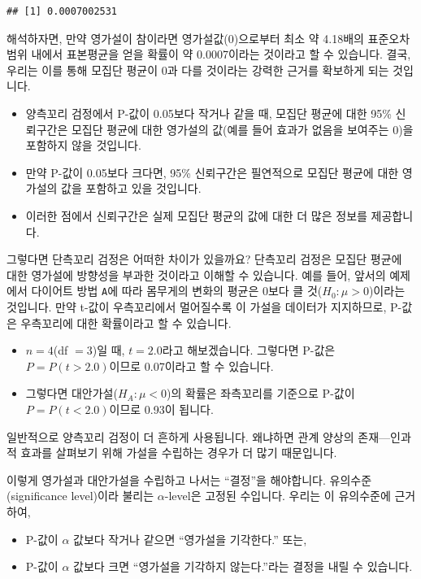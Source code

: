 \documentclass[]{book}
\begin{document}
\begin{verbatim}
## [1] 0.0007002531
\end{verbatim}

해석하자면, 만약 영가설이 참이라면 영가설값(0)으로부터 최소 약 4.18배의 표준오차 범위 내에서 표본평균을 얻을 확률이 약 0.0007이라는 것이라고 할 수 있습니다. 결국, 우리는 이를 통해 모집단 평균이 0과 다를 것이라는 강력한 근거를 확보하게 되는 것입니다.

\begin{itemize}
\item
  양측꼬리 검정에서 P-값이 0.05보다 작거나 같을 때, 모집단 평균에 대한 95\% 신뢰구간은 모집단 평균에 대한 영가설의 값(예를 들어 효과가 없음을 보여주는 0)을 포함하지 않을 것입니다.
\item
  만약 P-값이 0.05보다 크다면, 95\% 신뢰구간은 필연적으로 모집단 평균에 대한 영가설의 값을 포함하고 있을 것입니다.
\item
  이러한 점에서 신뢰구간은 실제 모집단 평균의 값에 대한 더 많은 정보를 제공합니다.
\end{itemize}

그렇다면 단측꼬리 검정은 어떠한 차이가 있을까요? 단측꼬리 검정은 모집단 평균에 대한 영가설에 방향성을 부과한 것이라고 이해할 수 있습니다. 예를 들어, 앞서의 예제에서 다이어트 방법 \texttt{A}에 따라 몸무게의 변화의 평균은 0보다 클 것(\(H_0: \mu > 0\))이라는 것입니다. 만약 t-값이 우측꼬리에서 멀어질수록 이 가설을 데이터가 지지하므로, P-값은 우측꼬리에 대한 확률이라고 할 수 있습니다.

\begin{itemize}
\item
  \(n = 4\)(df \(=3\))일 때, \(t = 2.0\)라고 해보겠습니다. 그렇다면 P-값은 \(P = P(t > 2.0)\)이므로 0.07이라고 할 수 있습니다.
\item
  그렇다면 대안가설(\(H_A: \mu < 0\))의 확률은 좌측꼬리를 기준으로 P-값이 \(P = P(t < 2.0)\)이므로 0.93이 됩니다.
\end{itemize}

일반적으로 양측꼬리 검정이 더 흔하게 사용됩니다. 왜냐하면 관계 양상의 존재---인과적 효과를 살펴보기 위해 가설을 수립하는 경우가 더 많기 때문입니다.

이렇게 영가설과 대안가설을 수립하고 나서는 ``결정''을 해야합니다. 유의수준(significance level)이라 불리는 \(\alpha\)-level은 고정된 수입니다. 우리는 이 유의수준에 근거하여,

\begin{itemize}
\item
  P-값이 \(\alpha\) 값보다 작거나 같으면 ``영가설을 기각한다.'' 또는,
\item
  P-값이 \(\alpha\) 값보다 크면 ``영가설을 기각하지 않는다.''라는 결정을 내릴 수 있습니다.
\end{itemize}
\end{document}
